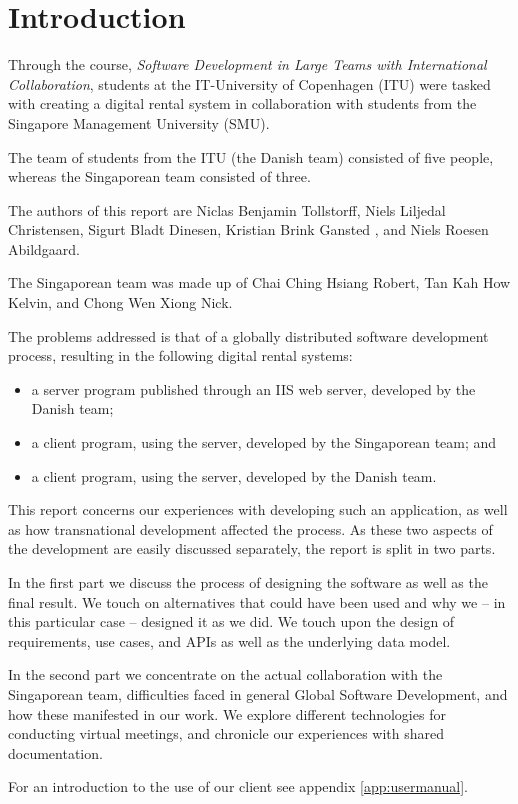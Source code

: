 \section{Introduction}
Through the course, \emph{Software Development in Large Teams with
International Collaboration}, students at the IT-University of Copenhagen (ITU)
were tasked with creating a digital rental system in collaboration with
students from the Singapore Management University (SMU).

The team of students from the ITU (the Danish team) consisted of five people,
whereas the Singaporean team consisted of three.

The authors of this report are Niclas Benjamin Tollstorff, Niels Liljedal
Christensen, Sigurt Bladt Dinesen, Kristian Brink Gansted , and Niels Roesen
Abildgaard.

The Singaporean team was made up of Chai Ching Hsiang Robert, Tan Kah How Kelvin, and
Chong Wen Xiong Nick.

The problems addressed is that of a globally distributed software development
process, resulting in the following digital rental systems:
\begin{itemize}
    \item a server program published through an IIS web server, developed by the Danish team;
    \item a client program, using the server, developed by the Singaporean team; and
    \item a client program, using the server, developed by the Danish team.
\end{itemize}

This report concerns our experiences with developing such an application, as well as how
transnational development affected the process. As these two aspects of the development
are easily discussed separately, the report is split in two parts.

In the first part we discuss the process of designing the software as well as the final
result. We touch on alternatives that could have been used and why we – in this particular
case – designed it as we did. We touch upon the design of requirements, use cases, and APIs
as well as the underlying data model.

In the second part we concentrate on the actual collaboration with the Singaporean team,
difficulties faced in general Global Software Development, and how these manifested in
our work. We explore different technologies for conducting virtual meetings, and chronicle
our experiences with shared documentation.

For an introduction to the use of our client see appendix \ref{app:usermanual}.